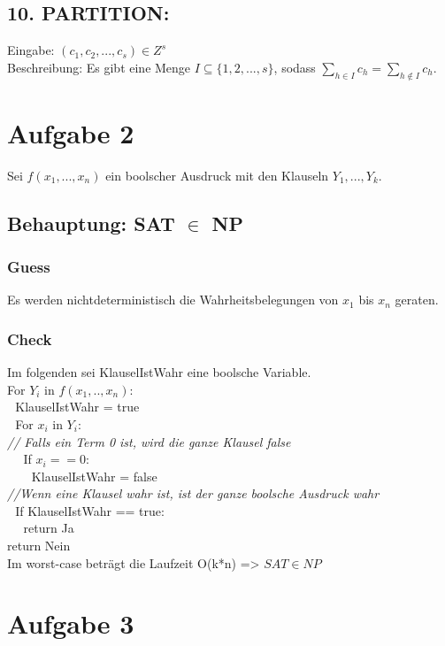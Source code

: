 \documentclass[a4paper,11pt,twoside]{article}
\begin{document}
\subsection*{10. PARTITION:}
Eingabe: $(c_1, c_2, ..., c_s) \in Z^{s}$\\
Beschreibung: Es gibt eine Menge $I \subseteq \{1,2,...,s\}$, sodass $\sum_{h \in I} c_h = \sum_{h \notin I} c_h$.\\


\section*{Aufgabe 2}
Sei $f(x_1, ..., x_n)$ ein boolscher Ausdruck mit den Klauseln $Y_1, ..., Y_k$. 

\subsection*{Behauptung: SAT $\in$ NP}
\subsubsection*{Guess}
Es werden nichtdeterministisch die Wahrheitsbelegungen von $x_1$ bis $x_n$ geraten.
\subsubsection*{Check}
Im folgenden sei KlauselIstWahr eine boolsche Variable.\\
For $Y_i$ in $f(x_1,.., x_n)$:\\
$~~~$KlauselIstWahr = true\\
$~~~$For $x_i$ in $Y_i$:\\
\textit{// Falls ein Term 0 ist, wird die ganze Klausel false}\\
$~~~~~~$If $x_i == 0$:\\ 
$~~~~~~~~~$KlauselIstWahr = false\\
\textit{//Wenn eine Klausel wahr ist, ist der ganze boolsche Ausdruck wahr}\\
$~~~$If KlauselIstWahr == true:\\
$~~~~~~$return Ja\\
return Nein\\

Im worst-case beträgt die Laufzeit O(k*n) => $SAT \in NP$



\section*{Aufgabe 3}
\end{document}
